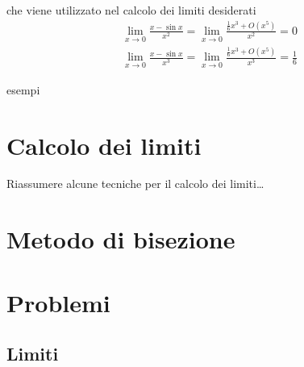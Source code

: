 \documentclass[letterpaper,10pt,italian]{jupyterBook}
\begin{document}
\begin{itemize}
\begin{equation*}
\end{equation*}
\sphinxAtStartPar
che viene utilizzato nel calcolo dei limiti desiderati
\begin{equation*}
\begin{split}\lim_{x \rightarrow 0} \frac{x - \sin x}{x^2} = \lim_{x \rightarrow 0} \frac{\frac{1}{6} x^3 + O(x^5)}{x^2} = 0 \end{split}
\end{equation*}\begin{equation*}
\begin{split}\lim_{x \rightarrow 0} \frac{x - \sin x}{x^3} = \lim_{x \rightarrow 0} \frac{\frac{1}{6} x^3 + O(x^5)}{x^3} = \frac{1}{6} \end{split}
\end{equation*}
\end{itemize}

\sphinxAtStartPar
{} esempi


\section{Calcolo dei limiti}
\label{\detokenize{ch/infinitesimal_calculus/analysis:calcolo-dei-limiti}}\label{\detokenize{ch/infinitesimal_calculus/analysis:infinitesimal-calculus-limits-eval}}
\sphinxAtStartPar
{} Riassumere alcune tecniche per il calcolo dei limiti…


\section{Metodo di bisezione}
\label{\detokenize{ch/infinitesimal_calculus/analysis:metodo-di-bisezione}}\label{\detokenize{ch/infinitesimal_calculus/analysis:infinitesimal-calculus-continuous-fun-bisec}}


\sphinxstepscope


\section{Problemi}
\label{\detokenize{ch/infinitesimal_calculus/analysis-problems:problemi}}\label{\detokenize{ch/infinitesimal_calculus/analysis-problems:infinitesimal-calculus-analysis-problems}}\label{\detokenize{ch/infinitesimal_calculus/analysis-problems::doc}}

\subsection{Limiti}
\label{\detokenize{ch/infinitesimal_calculus/analysis-problems:limiti}} \label{exercise:ch/infinitesimal_calculus/analysis-problems-exercise-0}
\end{document}
